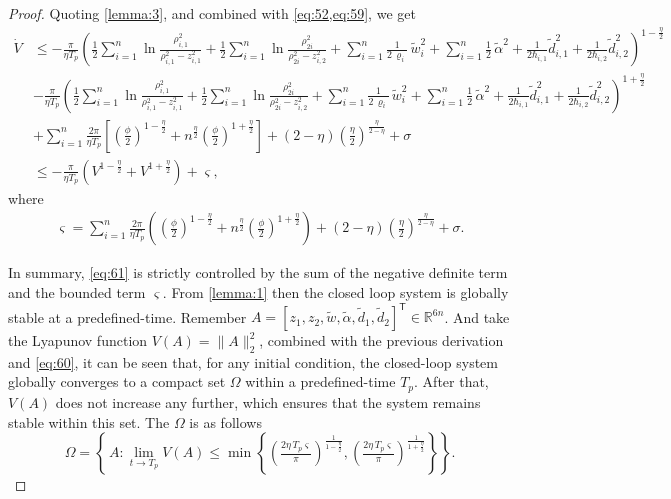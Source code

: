 \documentclass[pdflatex,sn-mathphys-num]{sn-jnl}%
\theoremstyle{thmstyleone}%
\theoremstyle{thmstyletwo}%
\theoremstyle{thmstylethree}%
\begin{document}
\begin{proof}
Quoting \cref{lemma:3}, and combined with \cref{eq:52,eq:59}, we get
\begin{equation}\label{eq:60}
	\begin{aligned}
		\dot{V}
		 & \le-\frac{\pi}{\eta T_{p}}\left(\frac{1}{2}\sum_{i=1}^{n} \ln\frac{\rho_{i,1}^2}{\rho_{i,1}^2-z_{i,1}^2}
		+ \frac{1}{2}\sum_{i=1}^{n} \ln\frac{\rho_{2i}^2}{\rho_{2i}^2-z_{i,2}^2}
		+ \sum_{i=1}^{n}\frac{1}{2\,\varrho_i}\,\tilde w_i^2+\sum_{i=1}^{n}\frac{1}{2}\,{\tilde{\alpha}}^2+\frac{1}{2\hbar_{i,1}}{\tilde d}^2_{i,1}+\frac{1}{2\hbar_{i,2}}{\tilde d}^2_{i,2}\right)^{1-\frac{\eta}{2}} \\
		 & -\frac{\pi }{\eta T_{p}}\left(\frac{1}{2}\sum_{i=1}^{n} \ln\frac{\rho_{i,1}^2}{\rho_{i,1}^2-z_{i,1}^2}
		+ \frac{1}{2}\sum_{i=1}^{n} \ln\frac{\rho_{2i}^2}{\rho_{2i}^2-z_{i,2}^2}
		+ \sum_{i=1}^{n}\frac{1}{2\,\varrho_i}\,\tilde w_i^2+\sum_{i=1}^{n}\frac{1}{2}\,{\tilde{\alpha}}^2+\frac{1}{2\hbar_{i,1}}{\tilde d}^2_{i,1}+\frac{1}{2\hbar_{i,2}}{\tilde d}^2_{i,2}\right)^{1+\frac{\eta}{2}} \\
		 & +\sum_{i=1}^{n}\frac{2\pi}{\eta T_{p}} \left[  \left(\frac{\phi}{2}\right)^{1-\frac{\eta}{2}} + n^{\frac\eta2}\left(\frac{\phi}{2}\right)^{1+\frac{\eta}{2}}  \right]+\left( 2-\eta\right) \left(\frac{\eta}{2}\right)^{\frac{\eta}{2-\eta}}+\sigma      \\
		 & \le-\frac{\pi}{\eta T_{p}}\left( V^{1-\frac{\eta}{2}}+V^{1+\frac{\eta}{2}}\right)+\varsigma    ,                                                                    
	\end{aligned}
\end{equation}
where
\begin{equation}\label{eq:61}
	\begin{aligned}
\varsigma =\sum_{i=1}^{n}\frac{2\pi}{\eta T_{p}} \left(  (\frac{\phi}{2})^{1-\frac{\eta}{2}} + n^{\frac\eta2}(\frac{\phi}{2})^{1+\frac{\eta}{2}}  \right)+\left( 2-\eta\right) \left(\frac{\eta}{2}\right)^{\frac{\eta}{2-\eta}}+\sigma.
		\end{aligned}
\end{equation}

In summary, \cref{eq:61} is strictly controlled by the sum of the negative definite term and the bounded term $\varsigma$. From \cref{lemma:1} then the closed loop system is globally stable at a predefined-time. Remember 
$A=\left[z_1, z_2,\tilde w,\tilde \alpha, {\tilde d}_{1}, {\tilde d}_{2}\right]^{\mathsf T} \in \mathbb{R}^{6n}$. And take the Lyapunov function $V(A)=\|A\|_2^2$, combined with the previous derivation and \cref{eq:60}, it can be seen that, for any initial condition, the closed-loop system globally converges to a compact set $\Omega$ within a predefined-time $T_p$. After that, $V(A)$ does not increase any further, which ensures that the system remains stable within this set. The $\Omega$ is as follows
\begin{equation}\label{eq:62}
	\Omega
	=\left\{\,A : \lim_{t\to T_p}V(A) \le
	\min\left\{
	\left(\tfrac{2\eta\,T_p \varsigma }{\pi}\right)^{\!{\frac{1}{1-\frac{\eta}{2}}}}\!,
	\left(\tfrac{2\eta\,T_p \varsigma }{\pi}\right)^{\!{\frac{1}{1+\frac{\eta}{2}}}}
	\right\}\right\}.
\end{equation}


\end{proof}
\end{document}
